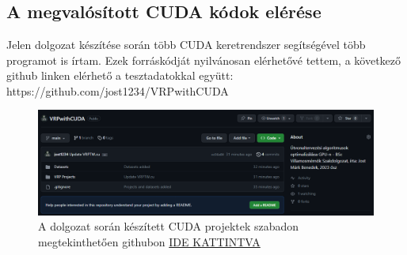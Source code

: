 \appendix
\chapter*{\fuggelek}
\setcounter{chapter}{\appendixnumber}
\section{A megvalósított CUDA kódok elérése}
Jelen dolgozat készítése során több CUDA keretrendszer segítségével több programot is írtam. Ezek forráskódját nyilvánosan elérhetővé tettem, a következő github linken elérhető a tesztadatokkal együtt: https://github.com/jost1234/VRPwithCUDA

\begin{figure}[!ht]
\centering
\includegraphics[width=150mm, keepaspectratio]{figures/github.png}
\caption{A dolgozat során készített CUDA projektek szabadon megtekinthetően githubon \href{https://github.com/jost1234/VRPwithCUDA}{IDE KATTINTVA}}
\label{fig:github} 
\end{figure}



